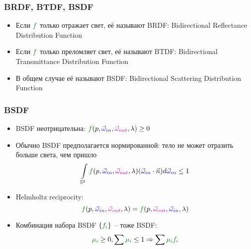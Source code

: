 \documentclass{beamer}
\begin{document}
\begin{frame}[fragile]
\frametitle{BRDF, BTDF, BSDF}
\begin{itemize}
\item Если \begin{math}{\color{green}f}\end{math} только отражает свет, её называют BRDF: Bidirectional Reflectance Distribution Function
\pause 
\item Если \begin{math}{\color{green}f}\end{math} только преломляет свет, её называют BTDF: Bidirectional Transmittance Distribution Function
\pause 
\item В общем случае её называют BSDF: Bidirectional Scattering Distribution Function
\end{itemize}
\end{frame}

\begin{frame}[fragile]
\frametitle{BSDF}
\begin{itemize}
\item BSDF неотрицательна: \begin{math}{\color{green}f}(p, {\color{blue}\vec\omega_{in}}, {\color{magenta}\vec\omega_{out}}, \lambda)\geq 0\end{math}
\pause
\item Обычно BSDF предполагается нормированной: тело не может отразить больше света, чем пришло
\begin{equation*}
\int\limits_{\mathbb S^2} {\color{green}f}(p, {\color{blue}\vec\omega_{in}}, {\color{magenta}\vec\omega_{out}}, \lambda)({\color{blue}\vec\omega_{in}} \cdot \vec{n}) d{\color{blue}\vec\omega_{in}} \leq 1
\end{equation*}
\pause
\item Helmholtz reciprocity:
\begin{equation*}
{\color{green}f}(p, {\color{blue}\vec\omega_{in}}, {\color{magenta}\vec\omega_{out}}, \lambda) = {\color{green}f}(p, {\color{magenta}\vec\omega_{out}}, {\color{blue}\vec\omega_{in}}, \lambda)
\end{equation*}
\pause
\item Комбинация набора BSDF \begin{math}\{{\color{green}f_i}\}\end{math} -- тоже BSDF:
\begin{equation*}
{\color{green}\mu_i} \geq 0, \sum {\color{green}\mu_i} \leq 1 \Rightarrow \sum {\color{green}\mu_i f_i}
\end{equation*}
\end{itemize}
\end{frame}
\end{document}
